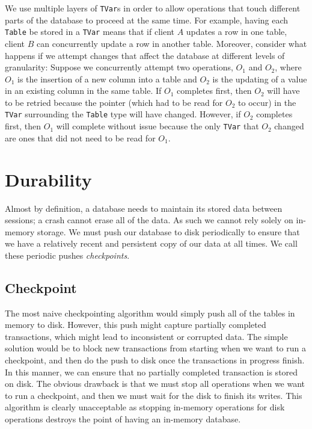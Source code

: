 \documentclass[10pt]{article}
\begin{document}
\begin{multicols}{2}
We use multiple layers of \texttt{TVar}s in order to allow operations that touch different parts of the database to proceed at the same time. For example, having each \texttt{Table} be stored in a \texttt{TVar} means that if client $A$ updates a row in one table, client $B$ can concurrently update a row in another table. Moreover, consider what happens if we attempt changes that affect the database at different levels of granularity: Suppose we concurrently attempt two operations, $O_1$ and $O_2$, where $O_1$ is the insertion of a new column into a table and $O_2$ is the updating of a value in an existing column in the same table. If $O_1$ completes first, then $O_2$ will have to be retried because the pointer (which had to be read for $O_2$ to occur) in the \texttt{TVar} surrounding the \texttt{Table} type will have changed. However, if $O_2$ completes first, then $O_1$ will complete without issue because the only \texttt{TVar} that $O_2$ changed are ones that did not need to be read for $O_1$. 

\section{Durability}
Almost by definition, a database needs to maintain its stored data between sessions; a crash cannot erase all of the data. As such we cannot rely solely on in-memory storage. We must push our database to disk periodically to ensure that we have a relatively recent and persistent copy of our data at all times. We call these periodic pushes \textit{checkpoints}.

\subsection{Checkpoint}
The most naive checkpointing algorithm would simply push all of the tables in memory to disk. However, this push might capture partially completed transactions, which might lead to inconsistent or corrupted data. The simple solution would be to block new transactions from starting when we want to run a checkpoint, and then do the push to disk once the transactions in progress finish. In this manner, we can ensure that no partially completed transaction is stored on disk. The obvious drawback is that we must stop all operations when we want to run a checkpoint, and then we must wait for the disk to finish its writes. This algorithm is clearly unacceptable as stopping in-memory operations for disk operations destroys the point of having an in-memory database.


\end{multicols}
\end{document}
